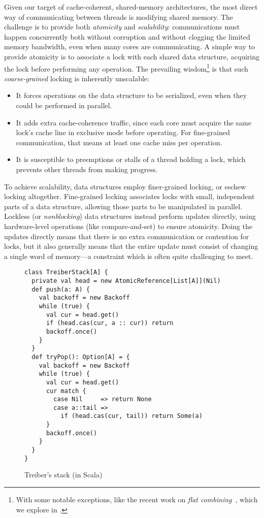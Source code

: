 \documentclass[preprint]{sigplanconf}
\begin{document}
Given our target of cache-coherent, shared-memory architectures, the
most direct way of communicating between threads is modifying shared
memory.  The challenge is to provide both \emph{atomicity} and
\emph{scalability}: communications must happen concurrently both
without corruption and without clogging the limited memory bandwidth,
even when many cores are communicating.  A simple way to provide
atomicity is to associate a lock with each shared data structure,
acquiring the lock before performing any operation.  The prevailing
wisdom\footnote{With some notable exceptions, like the recent work on
  \emph{flat combining}~\cite{?}, which we explore in .} is
that such \emph{coarse-grained} locking is inherently unscalable:
\begin{itemize}
\item It forces operations on the data structure to be serialized,
  even when they could be performed in parallel.
\item It adds extra cache-coherence traffic, since each core must
  acquire the same lock's cache line in exclusive mode before
  operating.  For fine-grained communication, that means at least one
  cache miss per operation.
\item It is susceptible to preemptions or stalls of a
  thread holding a lock, which prevents other threads from making progress.
\end{itemize}

To achieve scalability, data structures employ finer-grained locking,
or eschew locking altogether.  Fine-grained locking associates locks
with small, independent parts of a data structure, allowing those
parts to be manipulated in parallel.  Lockless (or \emph{nonblocking})
data structures instead perform updates directly, using hardware-level
operations (like compare-and-set) to ensure atomicity.  Doing the
updates directly means that there is no extra communication or
contention for locks, but it also generally means that the entire
update must consist of changing a single word of memory---a constraint
which is often quite challenging to meet.

\begin{figure}
\begin{lstlisting}
class TreiberStack[A] {
  private val head = new AtomicReference[List[A]](Nil)
  def push(a: A) {
    val backoff = new Backoff
    while (true) {
      val cur = head.get()
      if (head.cas(cur, a :: cur)) return
      backoff.once()
    }
  }
  def tryPop(): Option[A] = {
    val backoff = new Backoff
    while (true) {
      val cur = head.get() 
      cur match {
        case Nil     => return None
        case a::tail => 
          if (head.cas(cur, tail)) return Some(a)
      }
      backoff.once()
    }
  }
}
\end{lstlisting}
\nocaptionrule
\caption{Treiber's stack (in Scala)}
\label{fig:classic-treiber}
\end{figure}
\end{document}
